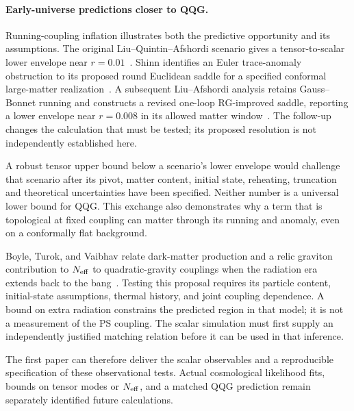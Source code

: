 \paragraph*{Early-universe predictions closer to QQG.}
Running-coupling inflation illustrates both the predictive opportunity and its assumptions.  The original Liu--Quintin--Afshordi scenario gives a tensor-to-scalar lower envelope near $r=0.01$~\cite{Liu:2026}.  Shinn identifies an Euler trace-anomaly obstruction to its proposed round Euclidean saddle for a specified conformal large-matter realization~\cite{Shinn:2026}.  A subsequent Liu--Afshordi analysis retains Gauss--Bonnet running and constructs a revised one-loop RG-improved saddle, reporting a lower envelope near $r=0.008$ in its allowed matter window~\cite{LiuAfshordi:2026}.  The follow-up changes the calculation that must be tested; its proposed resolution is not independently established here.

A robust tensor upper bound below a scenario's lower envelope would challenge that scenario after its pivot, matter content, initial state, reheating, truncation and theoretical uncertainties have been specified.  Neither number is a universal lower bound for QQG.  This exchange also demonstrates why a term that is topological at fixed coupling can matter through its running and anomaly, even on a conformally flat background.

Boyle, Turok, and Vaibhav relate dark-matter production and a relic graviton contribution to $N_{\rm eff}$ to quadratic-gravity couplings when the radiation era extends back to the bang~\cite{Boyle:2026}.  Testing this proposal requires its particle content, initial-state assumptions, thermal history, and joint coupling dependence.  A bound on extra radiation constrains the predicted region in that model; it is not a measurement of the PS coupling.  The scalar simulation must first supply an independently justified matching relation before it can be used in that inference.

The first paper can therefore deliver the scalar observables and a reproducible specification of these observational tests.  Actual cosmological likelihood fits, bounds on tensor modes or $N_{\rm eff}$, and a matched QQG prediction remain separately identified future calculations.
